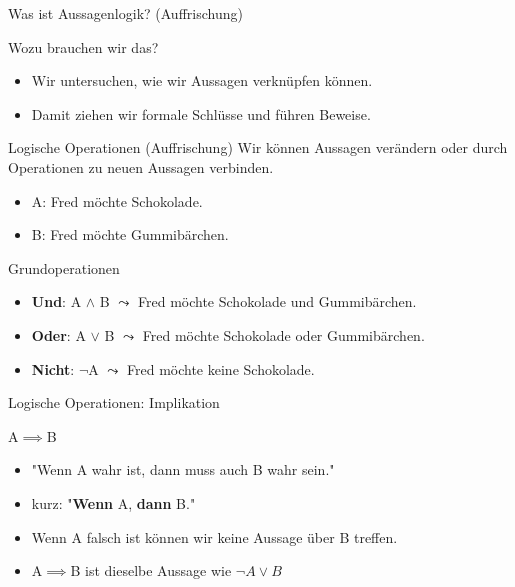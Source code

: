 \begin{frame}[fragile]{Was ist Aussagenlogik? (Auffrischung)}
    \begin{alertblock}{Wozu brauchen wir das?}
    \begin{itemize}
        \item Wir untersuchen, wie wir Aussagen verknüpfen können.
        \item Damit ziehen wir formale Schlüsse und führen Beweise.
    \end{itemize}
    \end{alertblock}
\end{frame}

\begin{frame}[fragile]{Logische Operationen (Auffrischung)}
Wir können Aussagen verändern oder durch Operationen zu neuen Aussagen verbinden.
\begin{itemize}
    \item A: Fred möchte Schokolade.
    \item B: Fred möchte Gummibärchen.
\end{itemize}
\begin{alertblock}{Grundoperationen}
\begin{itemize}
    \item<1-> \textbf{Und}: A \alert<1>{$\wedge$} B $\leadsto$ Fred möchte Schokolade \alert<1>{und} Gummibärchen.
    \item<2-> \textbf{Oder}: A \alert<2>{$\vee$} B $\leadsto$ Fred möchte Schokolade \alert<2>{oder} Gummibärchen.\\
    \item<3> \textbf{Nicht}: \alert<3>{$\neg$}A $\leadsto$ Fred möchte \alert<3>{keine} Schokolade.
\end{itemize}
\end{alertblock}
\end{frame}

\begin{frame}{Logische Operationen: Implikation}
\begin{alertblock}{A$\implies$B}
\begin{itemize}
    \item "Wenn A wahr ist, dann muss auch B wahr sein."
    \item kurz: "\textbf{Wenn} A, \textbf{dann} B."
    \item Wenn A falsch ist können wir keine Aussage über B treffen.
    \item A$\implies$B ist dieselbe Aussage wie $\neg A \vee B$
\end{itemize}
\end{alertblock}
\end{frame}

